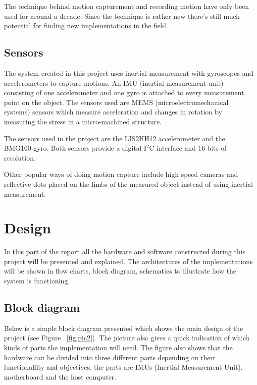 \documentclass[a4paper, 12pt]{article}
\begin{document}
The technique behind motion capturement and recording motion have only been used for around a decade. Since the technique is rather new there's still much potential for finding new implementations in the field.
 

    

  
\subsection*{Sensors}
The system created in this project uses inertial measurement with gyroscopes and accelerometers to capture motions. An IMU (inertial measurement unit) consisting of one accelerometer and one gyro is attached to every measurement point on the object. The sensors used are MEMS (microelectromechanical systems) sensors which measure acceleration and changes in rotation by measuring the stress in a micro-machined structure.\cite{mems}

The sensors used in the project are the LIS2HH12\cite{accelerometer} accelerometer and the BMG160\cite{gyro} gyro. Both sensors provide a digital I$^2$C interface and 16 bits of resolution.

Other popular ways of doing motion capture include high speed cameras and reflective dots placed on the limbs of the measured object instead of using inertial measurement.\cite{wiki}

\section*{Design}
In this part of the report all the hardware and software constructed during this project will be presented and explained. The architectures of the implementations will be shown in flow charts, block diagram, schematics to illustrate how the system is functioning.  

\subsection*{Block diagram}
Below is a simple block diagram presented which shows the main design of the project (see Figure ~\ref{fig:pic2}). The picture also gives a quick indication of which kinds of parts the implementation will need. The figure also shows that the hardware can be divided into three different parts depending on their functionallity and objectives, the parts are IMUs (Inertial Measurement Unit), motherboard and the host computer.     
 
\end{document}
